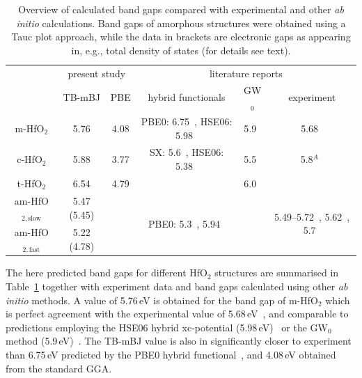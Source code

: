 \documentclass[10pt,a4paper,twocolumn]{article}
\begin{document}
\begin{table}
\begin{center}

\caption{Overview of calculated band gaps compared with experimental and other \textit{ab initio} calculations. Band gaps of amorphous structures were obtained using a Tauc plot approach, while the data in brackets are electronic gaps as appearing in, e.g., total density of states (for details see text).}
\label{gaps}

\begin{tabular}{c|cc|ccc}
\hline
& \multicolumn{2}{c|}{present study} & \multicolumn{3}{c}{literature reports}\\
			& TB-mBJ  & PBE & hybrid functionals & GW$_0$ & experiment \\
\hline
\hline
m-HfO$_2$ &	5.76 & 4.08 & PBE0: 6.75~\cite{Komsa2010}, HSE06: 5.98~\cite{Komsa2010} & 5.9~\cite{Gruning2010} & 5.68~\cite{Balog1977} \\
c-HfO$_2$ &	5.88 & 3.77 & SX: 5.6~\cite{Clark2010}, HSE06: 5.38~\cite{Yang2014} & 5.5~\cite{Gruning2010} & 5.8$^A$~\cite{Lim2002}\\
t-HfO$_2$ &	6.54 & 4.79 &  & 6.0~\cite{Gruning2010} & \\
am-HfO$_{2,\mathrm{slow}}$ & 5.47 (5.45) & & \multirow{2}{*}{PBE0: 5.3~\cite{Broqvist2007}, 5.94~\cite{Chen2011}} &  & \multirow{2}{*}{5.49--5.72~\cite{Takeuchi2004}, 5.62~\cite{Nguyen2005}, 5.7~\cite{Perevalov2007}}\\
am-HfO$_{2,\mathrm{fast}}$ & 5.22 (4.78) & &  &  & \\
\hline

\end{tabular}
\end{center}
\end{table}

The here predicted band gaps for different HfO$_2$ structures are summarised in Table~\ref{gaps} together with experiment data and band gaps calculated using other \textit{ab initio} methods.
A value of 5.76\,eV is obtained for the band gap of m-HfO$_2$ which is perfect agreement with the experimental value of 5.68\,eV~\cite{Balog1977}, and comparable to predictions employing the HSE06 hybrid xc-potential (5.98\,eV)~\cite{Komsa2010} or the GW$_0$ method (5.9\,eV)~\cite{Gruning2010}.
The TB-mBJ value is also in significantly closer to experiment than 6.75\,eV predicted by the PBE0 hybrid functional~\cite{Komsa2010}, and 4.08\,eV obtained from the standard GGA.
\end{document}
